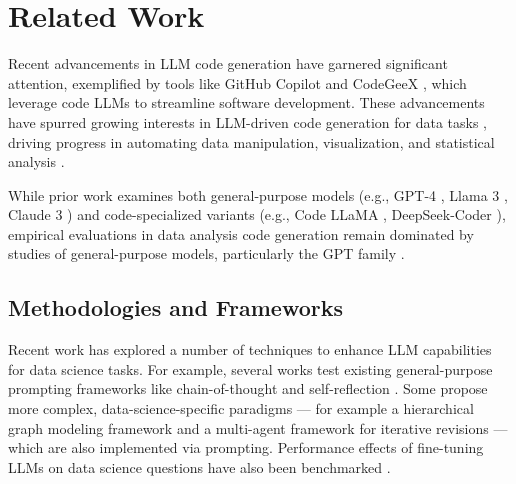 \section{Related Work}
Recent advancements in LLM code generation have garnered significant attention, exemplified by tools like GitHub Copilot \citep{chen2021evaluatinglargelanguagemodels} and CodeGeeX \citep{Zheng2023CodeGeeX}, which leverage code LLMs to streamline software development. 
These advancements have spurred growing interests in LLM-driven code generation for data tasks \citep{zhu2024large, gu2024blade}, driving progress in automating data manipulation, visualization, and statistical analysis \citep{hong2024datainterpreter, guo2024ds, Li2024AutomatedSM}.

While prior work examines both general-purpose models (e.g., GPT-4 \citep{openai2024gpt4}, Llama 3 \citep{grattafiori2024llama3}, Claude 3 \citep{TheC3}) and code-specialized variants (e.g., Code LLaMA \citep{rozière2024codellama}, DeepSeek-Coder \citep{guo2024deepseek}), empirical evaluations in data analysis code generation remain dominated by studies of general-purpose models, particularly the GPT family \citep{hong2024datainterpreter, gu2024blade, Li2024AutomatedSM, guo2024ds}.

\subsection{Methodologies and Frameworks}

Recent work has explored a number of techniques to enhance LLM capabilities for data science tasks. For example, several works \citep{majumder2024discoverybench, liu2024llms, zhu2024large} test existing general-purpose prompting frameworks like chain-of-thought \cite{wei2022chain} and self-reflection \cite{shinn2024reflexion}. %
Some propose more complex, data-science-specific paradigms --- for example a hierarchical graph modeling framework \citep{hong2024datainterpreter} and a multi-agent framework for iterative revisions \citep{guo2024ds} --- which are also implemented via prompting. Performance effects of fine-tuning LLMs on data science questions have also been benchmarked \cite{zhu2024large}.

